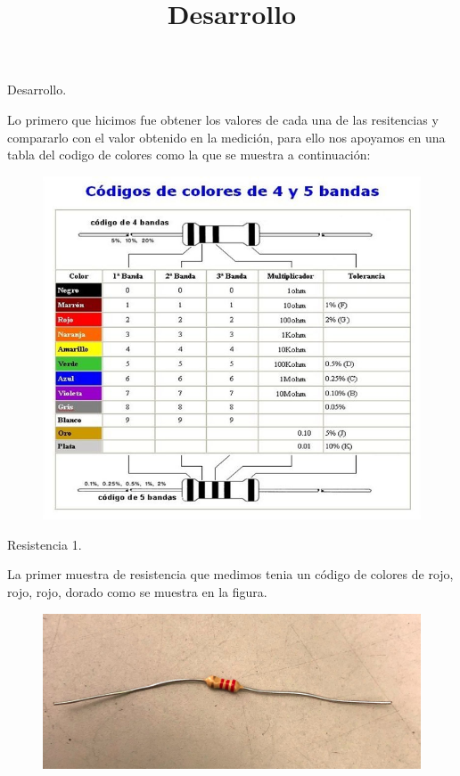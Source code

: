 

\title{Desarrollo}


	\begin{center}
		\begin{Large}
			Desarrollo.\\
			\vspace{1.5cm}
		\end{Large}
	\end{center}
\begin{flushleft}
	Lo primero que hicimos fue obtener los valores de cada una de las resitencias y compararlo con el  valor obtenido en la medici\'on, para ello nos apoyamos en una tabla del codigo de colores como la que se muestra a continuaci\'on:\\
	\vspace{0.5cm}
\begin{figure}[H]
	\centering
	\includegraphics[width=0.4\linewidth]{bandas}
	\label{fig:bandas}
	\vspace{0.5cm}
\end{figure}
	
	\begin{large}
		Resistencia 1.\\
	\end{large}

	La primer muestra de resistencia que medimos tenia un c\'odigo de colores de rojo, rojo, rojo, dorado como se muestra en la figura.\\
	\begin{figure}[H]
		\centering
		\includegraphics[width=0.4\linewidth]{resistencia1}
		\label{fig:resistencia1}
	\end{figure}


\end{flushleft}
